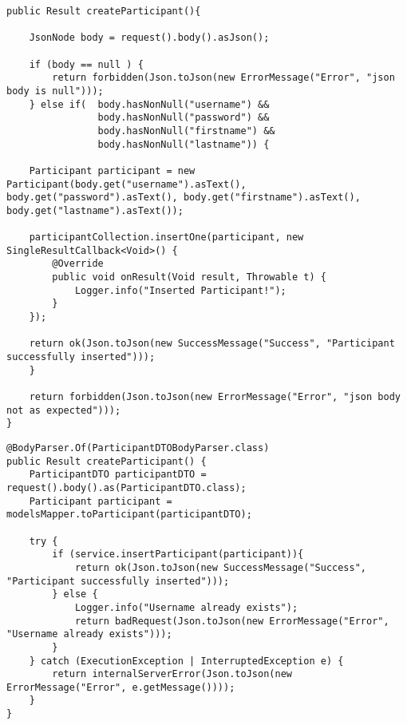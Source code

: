 \lstset{language=JAVA, showstringspaces=false, frame=single, captionpos=b, label=createParticipant, breaklines=true, numbers=left}
\begin{lstlisting}[caption={Participant erstellen vor Refactoring}, label=participantErstellenVorRef]
public Result createParticipant(){

    JsonNode body = request().body().asJson();

    if (body == null ) {
        return forbidden(Json.toJson(new ErrorMessage("Error", "json body is null")));
    } else if(  body.hasNonNull("username") &&
            	body.hasNonNull("password") &&
            	body.hasNonNull("firstname") &&
            	body.hasNonNull("lastname")) {

    Participant participant = new Participant(body.get("username").asText(), body.get("password").asText(), body.get("firstname").asText(), body.get("lastname").asText());

    participantCollection.insertOne(participant, new SingleResultCallback<Void>() {
        @Override
        public void onResult(Void result, Throwable t) {
            Logger.info("Inserted Participant!");
        }
    });

    return ok(Json.toJson(new SuccessMessage("Success", "Participant successfully inserted")));
    }

    return forbidden(Json.toJson(new ErrorMessage("Error", "json body not as expected")));
}
\end{lstlisting}

\begin{lstlisting}[caption={Participant erstellen nach Refactoring}, label=participantErstellenNachRef]
@BodyParser.Of(ParticipantDTOBodyParser.class)
public Result createParticipant() {
    ParticipantDTO participantDTO = request().body().as(ParticipantDTO.class);
    Participant participant = modelsMapper.toParticipant(participantDTO);

    try {
        if (service.insertParticipant(participant)){
            return ok(Json.toJson(new SuccessMessage("Success", "Participant successfully inserted")));
        } else {
            Logger.info("Username already exists");
            return badRequest(Json.toJson(new ErrorMessage("Error", "Username already exists")));
        }
    } catch (ExecutionException | InterruptedException e) {
        return internalServerError(Json.toJson(new ErrorMessage("Error", e.getMessage())));
    }
}
\end{lstlisting}

